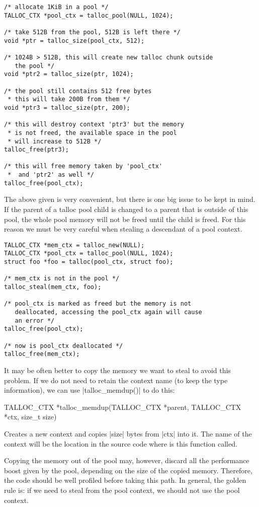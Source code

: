 \begin{lstlisting}[caption={Talloc pool},label=lst:talloc_pool,
morekeywords={talloc_pool}]
/* allocate 1KiB in a pool */
TALLOC_CTX *pool_ctx = talloc_pool(NULL, 1024);

/* take 512B from the pool, 512B is left there */
void *ptr = talloc_size(pool_ctx, 512);

/* 1024B > 512B, this will create new talloc chunk outside
   the pool */
void *ptr2 = talloc_size(ptr, 1024);

/* the pool still contains 512 free bytes
 * this will take 200B from them */
void *ptr3 = talloc_size(ptr, 200);

/* this will destroy context 'ptr3' but the memory
 * is not freed, the available space in the pool
 * will increase to 512B */
talloc_free(ptr3);

/* this will free memory taken by 'pool_ctx'
 *  and 'ptr2' as well */
talloc_free(pool_ctx);
\end{lstlisting}

\noindent
The above given is very convenient, but there is one big issue to be kept in
mind. If the parent of a talloc pool child is changed to a parent that is
outside of this pool, the whole pool memory will not be freed until the child is
freed. For this reason we must be very careful when stealing a descendant of a
pool context.

\begin{lstlisting}[caption={Stealing from pool context},
morekeywords={talloc_pool,talloc_steal,talloc_free}]
TALLOC_CTX *mem_ctx = talloc_new(NULL);
TALLOC_CTX *pool_ctx = talloc_pool(NULL, 1024);
struct foo *foo = talloc(pool_ctx, struct foo);

/* mem_ctx is not in the pool */
talloc_steal(mem_ctx, foo);

/* pool_ctx is marked as freed but the memory is not
   deallocated, accessing the pool_ctx again will cause
   an error */
talloc_free(pool_ctx);

/* now is pool_ctx deallocated */
talloc_free(mem_ctx);
\end{lstlisting}

\noindent
It may be often better to copy the memory we want to steal to avoid this
problem. If we do not need to retain the context name (to keep the type
information), we can use |talloc_memdup()| to do this:

\begin{funcproto}
TALLOC_CTX *talloc_memdup(TALLOC_CTX *parent,
                          TALLOC_CTX *ctx, size_t size)
\end{funcproto}
\begin{funcdesc}
Creates a new context and copies |size| bytes from |ctx| into it. The name of
the context will be the location in the source code where is this function
called.
\end{funcdesc}
\funclistend
Copying the memory out of the pool may, however, discard all the performance
boost given by the pool, depending on the size of the copied memory. Therefore,
the code should be well profiled before taking this path. In general, the
golden rule is: if we need to steal from the pool context, we should not
use the pool context.
